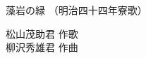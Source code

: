 \documentclass[10pt,b5j]{tarticle} %
\begin{document}
\begin{minipage}[c]{0.7\hsize} %
    \begin{center}
        {\LARGE
            藻岩の緑 %
        }
        {\small 
            （明治四十四年寮歌） %
        }
    \end{center}
\end{minipage}
\begin{minipage}[c]{0.3\hsize} %
    \begin{flushright} %
        松山茂助君 作歌\\柳沢秀雄君 作曲 %
    \end{flushright}
\end{minipage}
\end{document}
